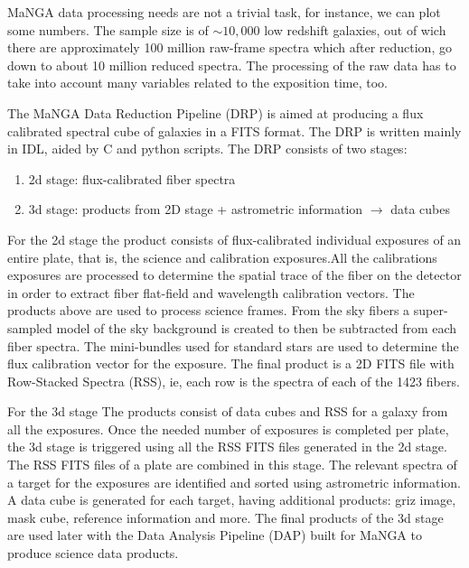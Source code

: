 MaNGA data processing needs are not a trivial task, for instance, we can plot some numbers. The sample size is of $ \sim 10,000$ low redshift galaxies, out of wich there are approximately 100 million raw-frame spectra which after reduction, go down to about 10 million reduced spectra.
The processing of the raw data has to take into account many variables related to the exposition time, too.

The MaNGA Data Reduction Pipeline (DRP) is aimed at producing a flux calibrated spectral cube of galaxies in a FITS format. The DRP is written mainly in IDL, aided by C and python scripts. The DRP consists of two stages:

\begin{enumerate}
  \item 2d stage: flux-calibrated fiber spectra
  
  \item 3d stage: products from 2D stage + astrometric information $\rightarrow$ data cubes
\end{enumerate}

For the 2d stage the product consists of flux-calibrated individual exposures of an entire plate, that is, the science and calibration exposures.All the calibrations exposures are processed to determine the spatial trace of the fiber on the detector in order to extract fiber flat-field and wavelength calibration vectors. The products above are used to process science frames. From the sky fibers a super-sampled model of the sky background is created to then be subtracted from each fiber spectra. The mini-bundles used for standard stars are used to determine the flux calibration vector for the exposure. The final product is a 2D FITS file with Row-Stacked Spectra (RSS), ie, each row is the spectra of each of the 1423 fibers.  
 
For the 3d stage The products consist of data cubes and RSS for a galaxy from all the exposures. Once the needed number of exposures is completed per plate, the 3d stage is triggered using all the RSS FITS files generated in the 2d stage. The RSS FITS files of a plate are combined in this stage. The relevant spectra of a target for the exposures are identified and sorted using astrometric information. A data cube is generated for each target, having additional products: griz image, mask cube, reference information and more. The final products of the 3d stage are used later with the Data Analysis Pipeline (DAP) built for MaNGA to produce science data products.

